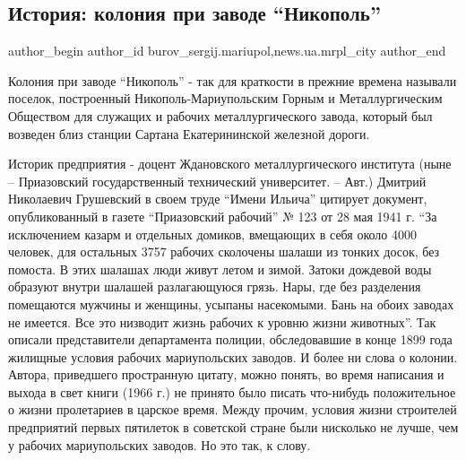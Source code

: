  
 
 
 
 
 
\subsection{История: колония при заводе \enquote{Никополь}}
\label{sec:27_02_2017.stz.news.ua.mrpl_city.1.istoria_kolonia_pri_zavode_nikopol}
 
\ifcmt
 author_begin
   author_id burov_sergij.mariupol,news.ua.mrpl_city
 author_end
\fi


Колония при заводе \enquote{Никополь} - так для краткости в прежние времена называли
поселок, построенный Никополь-Мариупольским Горным и Металлургическим Обществом
для служащих и рабочих металлургического завода, который был возведен близ
станции Сартана Екатерининской железной дороги.

Историк предприятия - доцент Ждановского металлургического института (ныне –
Приазовский государственный технический университет. – Авт.) Дмитрий Николаевич
Грушевский в своем труде \enquote{Имени Ильича} цитирует документ, опубликованный в
газете \enquote{Приазовский рабочий} № 123 от 28 мая 1941 г. \enquote{За исключением казарм и
отдельных домиков, вмещающих в себя около 4000 человек, для остальных 3757
рабочих сколочены ша­лаши из тонких досок, без помоста. В этих шалашах люди
живут летом и зимой. Затоки дождевой воды образуют внутри шалашей
разлагающуюся грязь. Нары, где без разделения помещаются мужчины и женщины,
усыпаны насекомыми. Бань на обоих заводах не имеется. Все это низводит жизнь
рабочих к уровню жизни животных}. Так описали представители департамента
полиции, обследовавшие в конце 1899 года жилищные условия рабочих
мариупольских заводов. И более ни слова о колонии. Автора, приведшего
пространную цитату, можно понять, во время написания и выхода в свет книги
(1966 г.) не принято было писать что-нибудь положительное о жизни пролетариев в
царское время. Между прочим, условия жизни строителей предприятий первых
пятилеток в советской стране были нисколько не лучше, чем у  рабочих
мариупольских заводов. Но это так, к слову.

